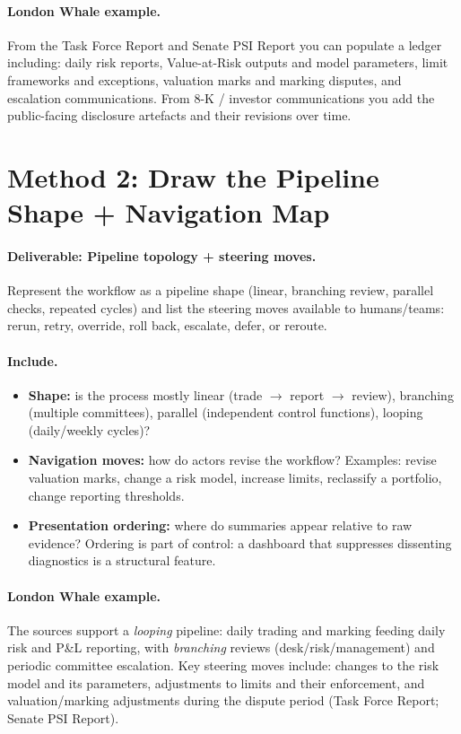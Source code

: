 \paragraph{London Whale example.}
From the Task Force Report and Senate PSI Report you can populate a ledger including: daily risk reports,
Value-at-Risk outputs and model parameters, limit frameworks and exceptions, valuation marks and marking disputes,
and escalation communications. From 8-K / investor communications you add the public-facing disclosure artefacts
and their revisions over time.

\section{Method 2: Draw the Pipeline Shape + Navigation Map}
\label{sec:m2-shape}

\paragraph{Deliverable: Pipeline topology + steering moves.}
Represent the workflow as a pipeline shape (linear, branching review, parallel checks, repeated cycles) and list the steering moves
available to humans/teams: rerun, retry, override, roll back, escalate, defer, or reroute.

\paragraph{Include.}
\begin{itemize}
  \item \textbf{Shape:} is the process mostly linear (trade $\rightarrow$ report $\rightarrow$ review),
        branching (multiple committees), parallel (independent control functions), looping (daily/weekly cycles)?
  \item \textbf{Navigation moves:} how do actors revise the workflow?
        Examples: revise valuation marks, change a risk model, increase limits, reclassify a portfolio, change reporting thresholds.
  \item \textbf{Presentation ordering:} where do summaries appear relative to raw evidence?
        Ordering is part of control: a dashboard that suppresses dissenting diagnostics is a structural feature.
\end{itemize}

\paragraph{London Whale example.}
The sources support a \emph{looping} pipeline: daily trading and marking feeding daily risk and P\&L reporting,
with \emph{branching} reviews (desk/risk/management) and periodic committee escalation.
Key steering moves include: changes to the risk model and its parameters, adjustments to limits and their enforcement,
and valuation/marking adjustments during the dispute period (Task Force Report; Senate PSI Report).

